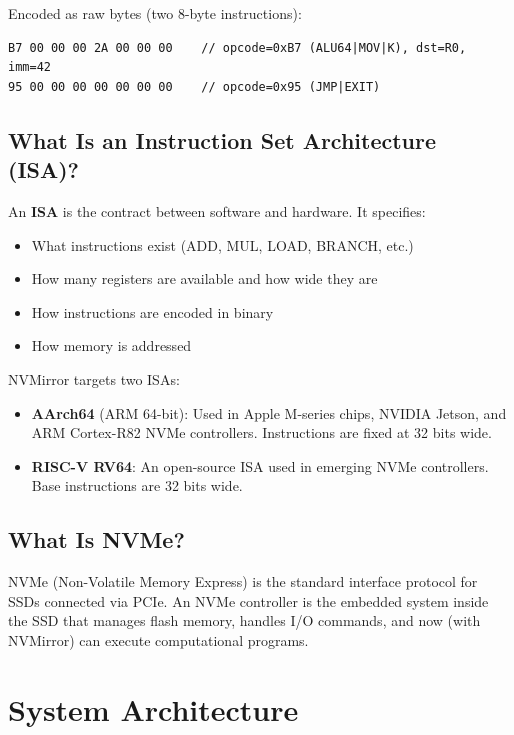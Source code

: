 \documentclass[11pt,letterpaper]{article}
\begin{document}
Encoded as raw bytes (two 8-byte instructions):
\begin{lstlisting}[style=asm]
B7 00 00 00 2A 00 00 00    // opcode=0xB7 (ALU64|MOV|K), dst=R0, imm=42
95 00 00 00 00 00 00 00    // opcode=0x95 (JMP|EXIT)
\end{lstlisting}

\subsection{What Is an Instruction Set Architecture (ISA)?}

\begin{definition}
An \textbf{ISA} is the contract between software and hardware. It specifies:
\begin{itemize}
    \item What instructions exist (ADD, MUL, LOAD, BRANCH, etc.)
    \item How many registers are available and how wide they are
    \item How instructions are encoded in binary
    \item How memory is addressed
\end{itemize}
\end{definition}

NVMirror targets two ISAs:
\begin{itemize}
    \item \textbf{AArch64} (ARM 64-bit): Used in Apple M-series chips, NVIDIA Jetson, and ARM Cortex-R82 NVMe controllers. Instructions are fixed at 32 bits wide.
    \item \textbf{RISC-V RV64}: An open-source ISA used in emerging NVMe controllers. Base instructions are 32 bits wide.
\end{itemize}

\subsection{What Is NVMe?}

NVMe (Non-Volatile Memory Express) is the standard interface protocol for SSDs connected via PCIe. An NVMe controller is the embedded system inside the SSD that manages flash memory, handles I/O commands, and now (with NVMirror) can execute computational programs.

\section{System Architecture}
\end{document}
